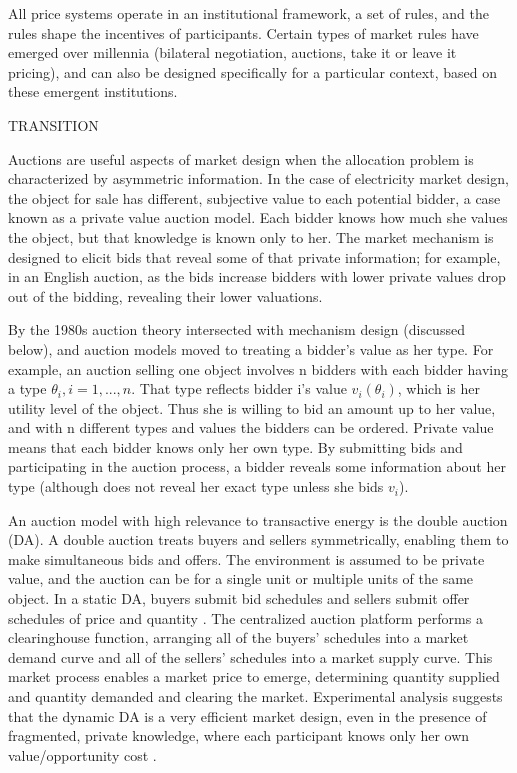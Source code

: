 All price systems operate in an institutional framework, a set of rules, and the rules shape the incentives of participants. Certain types of market rules have emerged over millennia (bilateral negotiation, auctions, take it or leave it pricing), and can also be designed specifically for a particular context, based on these emergent institutions.

TRANSITION

Auctions are useful aspects of market design when the allocation problem is characterized by asymmetric information. In the case of electricity market design, the object for sale has different, subjective value to each potential bidder, a case known as a private value auction model. Each bidder knows how much she values the object, but that knowledge is known only to her. The market mechanism is designed to elicit bids that reveal some of that private information; for example, in an English auction, as the bids increase bidders with lower private values drop out of the bidding, revealing their lower valuations.

By the 1980s auction theory intersected with mechanism design (discussed below), and auction models moved to treating a bidder’s value as her type. For example, an auction selling one object involves n bidders with each bidder having a type $\theta_i, i=1,...,n$. That type reflects bidder i’s value $v_i(\theta_i)$, which is her utility level of the object. Thus she is willing to bid an amount up to her value, and with n different types and values the bidders can be ordered. Private value means that each bidder knows only her own type. By submitting bids and participating in the auction process, a bidder reveals some information about her type (although does not reveal her exact type unless she bids $v_i$).

An auction model with high relevance to transactive energy is the double auction (DA). A double auction treats buyers and sellers symmetrically, enabling them to make simultaneous bids and offers. The environment is assumed to be private value, and the auction can be for a single unit or multiple units of the same object. In a static DA, buyers submit bid schedules and sellers submit offer schedules of price and quantity \citep{friedman1993double}. The centralized auction platform performs a clearinghouse function, arranging all of the buyers’ schedules into a market demand curve and all of the sellers’ schedules into a market supply curve. This market process enables a market price to emerge, determining quantity supplied and quantity demanded and clearing the market. Experimental analysis suggests that the dynamic DA is a very efficient market design, even in the presence of fragmented, private knowledge, where each participant knows only her own value/opportunity cost \citep{easley1993theories}.

